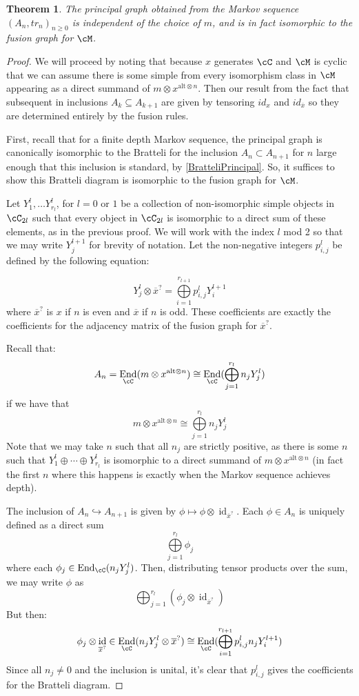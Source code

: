 \documentclass[11pt]{article}
\theoremstyle{plain}
\newtheorem{thm}{Theorem}[section]
\theoremstyle{definition}
\DeclareMathOperator{\End}{End}
\DeclareMathOperator{\id}{id}
\newcommand{\xalt}{x^{\text{alt}\otimes n}}
\newcommand{\act}{\overline{x}^{?}}
\begin{document}
\begin{thm}
The principal graph obtained from the Markov sequence $(A_n, tr_n)_{n\geq 0}$ is independent of the choice of $m$, and is in fact isomorphic to the fusion graph for $\cM$.
\end{thm}

\begin{proof}
We will proceed by noting that because $x$ generates $\cC$ and $\cM$ is cyclic that we can assume there is some simple from every isomorphism class in $\cM$ appearing as a direct summand of $m\otimes \xalt $. Then our result from the fact that subsequent in inclusions $A_k\subseteq A_{k+1}$ are given by tensoring $id_x$ and $id_{\overline{x}}$ so they are determined entirely by the fusion rules.

First, recall that for a finite depth Markov sequence, the principal graph is canonically isomorphic to the Bratteli for the inclusion $A_n\subset A_{n+1}$ for $n$ large enough that this inclusion is standard, by \ref{BratteliPrincipal}. So, it suffices to show this Bratteli diagram is isomorphic to the fusion graph for $\cM$. 

Let $Y^l_1,\ldots Y^l_{r_l}$, for $l=0$ or $1$ be a collection of non-isomorphic simple objects in $\cC_{2l}$ such that every object in $\cC_{2l}$ is isomorphic to a direct sum of these elements, as in the previous proof. 
	We will work with the index $l$ mod 2 so that we may write $Y^{l+1}_j$ for brevity of notation. 
	Let the non-negative integers $p^{l}_{i,j}$ be defined by the following equation:

$$Y^l_j\otimes \act=\bigoplus\limits_{i=1}^{r_{l+1}}p_{i,j}^lY^{l+1}_i$$
where $\act$ is $x$ if $n$ is even and $\overline{x}$ if $n$ is odd. 
These coefficients are exactly the coefficients for the adjacency matrix of the fusion graph for $\act$.

Recall that:
$$A_n=\End_{\cC}(m\otimes\xalt)\cong \End_{\cC}(\bigoplus\limits_{j=1}^{r_l}n_j Y^l_j)$$
if we have that 
$$m \otimes \xalt \cong \bigoplus\limits_{j=1}^{r_l}n_jY^l_j$$
Note that we may take $n$ such that all $n_j$ are strictly positive, as there is some $n$ such that $Y^{l}_1\oplus\cdots \oplus Y^{l}_{r_l}$ is isomorphic to a direct summand of $m\otimes \xalt$ (in fact the first $n$ where this happens is exactly when the Markov sequence achieves depth). 

The inclusion of $A_n \hookrightarrow A_{n+1}$ is given by $\phi \mapsto \phi \otimes \id_{\act}$. Each $\phi \in A_n$ is uniquely defined as a direct sum 
$$\bigoplus\limits_{j=1}^{r_l}\phi_j$$
where each $\phi_j \in \End_{\cC}(n_jY^{l}_j)$. Then, distributing tensor products over the sum, we may write $\phi$ as 
$$\bigoplus_{j=1}^{r_l}(\phi_j \otimes \id_{\act})$$
But then:
$$\phi_j \otimes \id_{\act}\in \End_{\cC}(n_jY^{l}_j\otimes \act)\cong \End_{\cC}(\bigoplus\limits_{i=1}^{r_{l+1}}p_{i,j}^ln_jY^{l+1}_i)$$
Since all $n_j\neq 0$ and the inclusion is unital, it's clear that $p_{i,j}^{l}$ gives the coefficients for the Bratteli diagram.
\end{proof}
\end{document}

